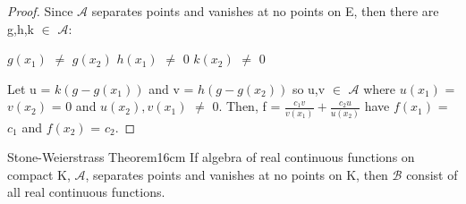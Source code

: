     \begin{proof}
        Since $\mathscr{A}$ separates points and vanishes at no points on E, then
        there are g,h,k $\in$ $\mathscr{A}$:

        \hspace{0.5cm}
        $g(x_1)$ $\not =$ $g(x_2)$
        \hspace{1cm}
        $h(x_1)$ $\not =$ 0
        \hspace{1cm}
        $k(x_2)$ $\not =$ 0

        Let u = $k(g - g(x_1))$ and v = $h(g - g(x_2))$ so u,v $\in$ $\mathscr{A}$
        where $u(x_1)$ = $v(x_2)$ = 0 and $u(x_2),v(x_1)$ $\not =$ 0.
        Then, f = $\frac{c_1v}{v(x_1)} + \frac{c_2u}{u(x_2)}$ have
        $f(x_1)$ = $c_1$ and $f(x_2)$ = $c_2$.
    \end{proof}

    \vspace{0.5cm}



    \begin{wtheorem}{Stone-Weierstrass Theorem}{16cm}
        If algebra of real continuous functions on compact K, $\mathscr{A}$,
        separates points and vanishes at no points on K, then $\mathscr{B}$
        consist of all real continuous functions.    
    \end{wtheorem}

